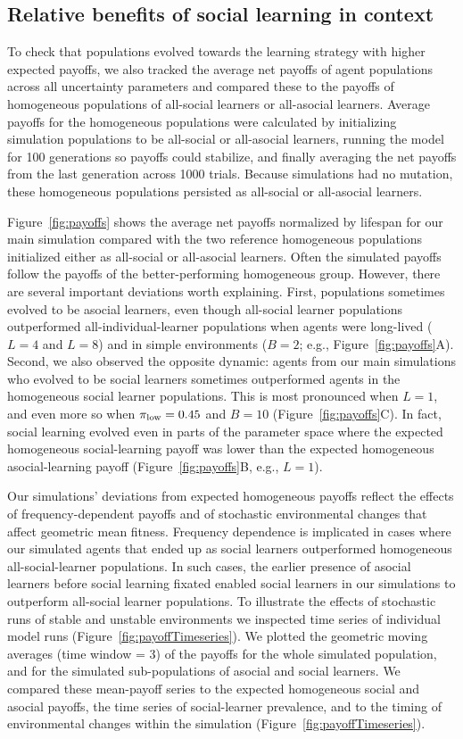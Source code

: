 \documentclass[letterpaper,11.5pt]{scrartcl}
\begin{document}
\subsection{Relative benefits of social learning in context}

To check that populations evolved towards the learning strategy with higher expected payoffs, we also tracked the average net payoffs of agent populations across
all uncertainty parameters and compared these to the payoffs of homogeneous populations of all-social learners or all-asocial
learners. Average payoffs for the homogeneous populations were calculated by initializing simulation populations to be all-social or
all-asocial learners, running the model for 100 generations so payoffs could stabilize, and finally averaging the net payoffs from
the last generation across 1000 trials. Because simulations had no mutation, these homogeneous populations persisted as all-social
or all-asocial learners.

Figure~\ref{fig:payoffs} shows the average net payoffs normalized by lifespan
for our main simulation compared with the two reference homogeneous populations
initialized either as all-social or all-asocial learners. Often the simulated payoffs follow the payoffs of the better-performing homogeneous group. However, there are several important deviations worth explaining. First, populations sometimes evolved to be asocial learners, even
though all-social learner populations outperformed all-individual-learner populations when agents were
long-lived ($L=4$ and $L=8$) and in simple environments ($B=2$; e.g., Figure~\ref{fig:payoffs}A).
Second, we also observed the opposite dynamic: agents from our main simulations who evolved to be social learners sometimes outperformed agents in the homogeneous social learner populations. This is most pronounced when $L=1$, and even more
so when $\pi_{\mathrm{low}}=0.45$ and $B=10$ (Figure~\ref{fig:payoffs}C).
In fact, social learning evolved even in parts of the parameter space where the expected homogeneous social-learning payoff was lower than the expected homogeneous
asocial-learning payoff (Figure~\ref{fig:payoffs}B, e.g., $L=1$).

Our simulations' deviations from expected homogeneous payoffs reflect the effects of frequency-dependent payoffs and of stochastic environmental changes that affect geometric mean fitness. Frequency dependence is implicated in cases where our simulated agents that ended up as social learners outperformed homogeneous all-social-learner populations. In such cases, the earlier presence of asocial learners before social learning fixated enabled social learners in our simulations to outperform all-social learner populations. To illustrate the effects of stochastic runs of stable and unstable environments we inspected time series of individual model runs (Figure~\ref{fig:payoffTimeseries}). We plotted the geometric moving averages (time window = 3) of the payoffs for the whole simulated population, and for the simulated sub-populations of asocial and social learners. We compared these mean-payoff series to the expected homogeneous social and asocial payoffs, the time series of social-learner prevalence, and to the timing of environmental changes within the simulation (Figure~\ref{fig:payoffTimeseries}). 
\end{document}
